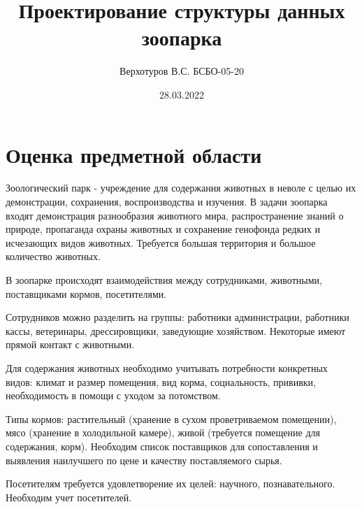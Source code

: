 \documentclass{article}
\title{Проектирование структуры данных зоопарка}
\author{Верхотуров В.С. БСБО-05-20}
\date{28.03.2022}
\begin{document}
\maketitle

\section{Оценка предметной области}

Зоологический парк - учреждение для содержания животных в неволе с целью их демонстрации, сохранения, воспроизводства и изучения. В задачи зоопарка входят демонстрация разнообразия животного мира, распространение знаний о природе, пропаганда охраны животных и сохранение генофонда редких и исчезающих видов животных. Требуется большая территория и большое количество животных.

В зоопарке происходят взаимодействия между сотрудниками, животными, поставщиками кормов, посетителями.

Сотрудников можно разделить на группы: работники администрации, работники кассы, ветеринары, дрессировщики, заведующие хозяйством. Некоторые имеют прямой контакт с животными.

Для содержания животных необходимо учитывать потребности конкретных видов: климат и размер помещения, вид корма, социальность, прививки, необходимость в помощи с уходом за потомством.

Типы кормов: растительный (хранение в сухом проветриваемом помещении), мясо (хранение в холодильной камере), живой (требуется помещение для содержания, корм). Необходим список поставщиков для сопоставления и выявления наилучшего по цене и качеству поставляемого сырья.

Посетителям требуется удовлетворение их целей: научного, познавательного. Необходим учет посетителей.
\end{document}
